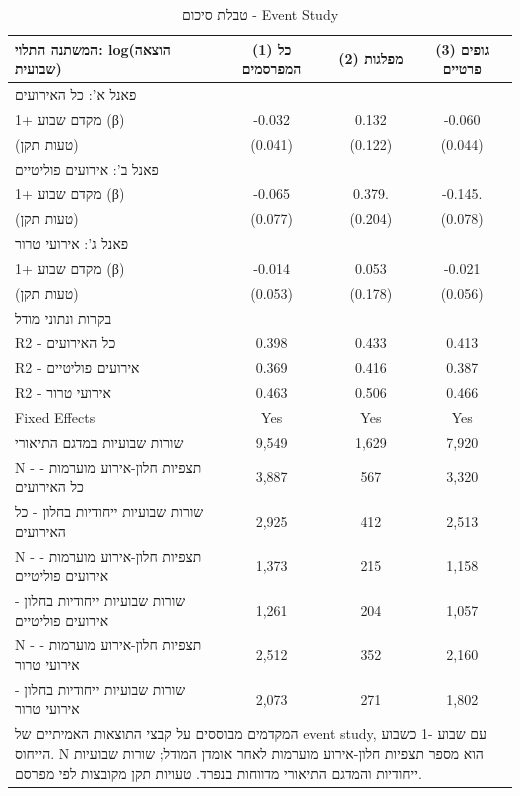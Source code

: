 \begin{table}[!htbp]
\centering
\caption{טבלת סיכום - Event Study}
\label{tab:event_study_panel_summary_baseline_minus1}
\begin{tabular}{lccc}
\hline\hline
המשתנה התלוי: log(הוצאה שבועית) & (1) כל המפרסמים & (2) מפלגות & (3) גופים פרטיים \\
\hline
\multicolumn{4}{l}{פאנל א': כל האירועים} \\
מקדם שבוע +1 (β) & -0.032 & 0.132 & -0.060 \\
(טעות תקן) & (0.041) & (0.122) & (0.044) \\
\multicolumn{4}{l}{פאנל ב': אירועים פוליטיים} \\
מקדם שבוע +1 (β) & -0.065 & 0.379. & -0.145. \\
(טעות תקן) & (0.077) & (0.204) & (0.078) \\
\multicolumn{4}{l}{פאנל ג': אירועי טרור} \\
מקדם שבוע +1 (β) & -0.014 & 0.053 & -0.021 \\
(טעות תקן) & (0.053) & (0.178) & (0.056) \\
\multicolumn{4}{l}{בקרות ונתוני מודל} \\
R2 - כל האירועים & 0.398 & 0.433 & 0.413 \\
R2 - אירועים פוליטיים & 0.369 & 0.416 & 0.387 \\
R2 - אירועי טרור & 0.463 & 0.506 & 0.466 \\
Fixed Effects & Yes & Yes & Yes \\
שורות שבועיות במדגם התיאורי & 9,549 & 1,629 & 7,920 \\
N - תצפיות חלון-אירוע מוערמות - כל האירועים & 3,887 & 567 & 3,320 \\
שורות שבועיות ייחודיות בחלון - כל האירועים & 2,925 & 412 & 2,513 \\
N - תצפיות חלון-אירוע מוערמות - אירועים פוליטיים & 1,373 & 215 & 1,158 \\
שורות שבועיות ייחודיות בחלון - אירועים פוליטיים & 1,261 & 204 & 1,057 \\
N - תצפיות חלון-אירוע מוערמות - אירועי טרור & 2,512 & 352 & 2,160 \\
שורות שבועיות ייחודיות בחלון - אירועי טרור & 2,073 & 271 & 1,802 \\
\hline
\multicolumn{4}{l}{\footnotesize המקדמים מבוססים על קבצי התוצאות האמיתיים של event study, עם שבוע -1 כשבוע הייחוס. N הוא מספר תצפיות חלון-אירוע מוערמות לאחר אומדן המודל; שורות שבועיות ייחודיות והמדגם התיאורי מדווחות בנפרד. טעויות תקן מקובצות לפי מפרסם.} \\
\hline\hline
\end{tabular}
\end{table}
